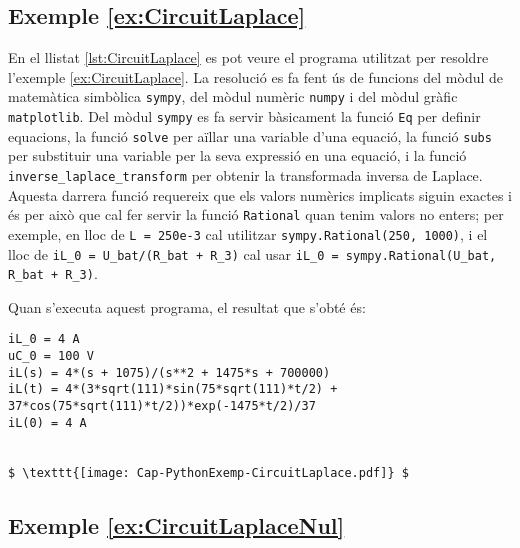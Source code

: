 \hypertarget{exemple:CircuitLaplace}{\subsection{Exemple \ref*{ex:CircuitLaplace} \CircuitLaplace}}
En el llistat \vref{lst:CircuitLaplace} es pot veure el programa utilitzat per resoldre l'exemple \vref{ex:CircuitLaplace}. La resolució es fa fent ús de funcions del mòdul de matemàtica simbòlica \texttt{sympy}, del mòdul numèric \texttt{numpy} i del mòdul gràfic  \texttt{matplotlib}. Del mòdul \texttt{sympy} es fa servir bàsicament la funció \texttt{Eq} per definir equacions,  la funció \texttt{solve} per aïllar una variable d'una equació, la funció \texttt{subs} per substituir  una variable per la seva expressió en una equació, i la   funció \texttt{inverse\_laplace\_transform} per obtenir la transformada inversa de Laplace. Aquesta  darrera funció requereix que els valors numèrics implicats siguin exactes i és per això que cal fer servir la funció \texttt{Rational} quan tenim valors no enters; per exemple, en lloc de \texttt{L = 250e-3} cal utilitzar \texttt{sympy.Rational(250, 1000)}, i el lloc de \texttt{iL\_0 =  U\_bat/(R\_bat + R\_3)} cal usar \texttt{iL\_0 = sympy.Rational(U\_bat, R\_bat + R\_3)}.


Quan s'executa aquest programa, el resultat que s'obté és:
\lstset{
	language=,
	numbers=none,
	frame=none
}
\begin{lstlisting}[mathescape=true]
iL_0 = 4 A
uC_0 = 100 V
iL(s) = 4*(s + 1075)/(s**2 + 1475*s + 700000)
iL(t) = 4*(3*sqrt(111)*sin(75*sqrt(111)*t/2) + 37*cos(75*sqrt(111)*t/2))*exp(-1475*t/2)/37
iL(0) = 4 A


$ \texttt{[image: Cap-PythonExemp-CircuitLaplace.pdf]} $
\end{lstlisting} 



\hypertarget{exemple:CircuitLaplaceNul}{\subsection{Exemple \ref*{ex:CircuitLaplaceNul} \CircuitLaplaceNul}}


